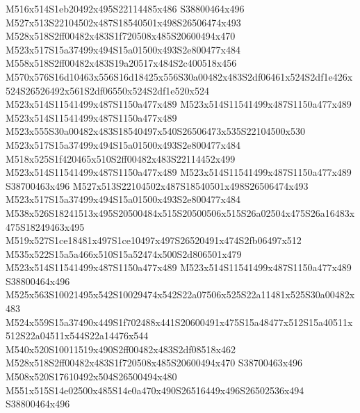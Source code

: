\documentclass{article}
\begin{document}
\begin{multicols}{2}
M516x514S1eb20492x495S22114485x486 S38800464x496 M527x513S22104502x487S18540501x498S26506474x493 M528x518S2ff00482x483S1f720508x485S20600494x470 M523x517S15a37499x494S15a01500x493S2e800477x484 M558x518S2ff00482x483S19a20517x484S2c400518x456 M570x576S16d10463x556S16d18425x556S30a00482x483S2df06461x524S2df1e426x524S26526492x561S2df06550x524S2df1e520x524 M523x514S11541499x487S1150a477x489 M523x514S11541499x487S1150a477x489 M523x514S11541499x487S1150a477x489 M523x555S30a00482x483S18540497x540S26506473x535S22104500x530 M523x517S15a37499x494S15a01500x493S2e800477x484 M518x525S1f420465x510S2ff00482x483S22114452x499 M523x514S11541499x487S1150a477x489 M523x514S11541499x487S1150a477x489 S38700463x496 M527x513S22104502x487S18540501x498S26506474x493 M523x517S15a37499x494S15a01500x493S2e800477x484 M538x526S18241513x495S20500484x515S20500506x515S26a02504x475S26a16483x475S18249463x495 M519x527S1ce18481x497S1ce10497x497S26520491x474S2fb06497x512 M535x522S15a5a466x510S15a52474x500S2d806501x479 M523x514S11541499x487S1150a477x489 M523x514S11541499x487S1150a477x489 S38800464x496 M525x563S10021495x542S10029474x542S22a07506x525S22a11481x525S30a00482x483 M524x559S15a37490x449S1f702488x441S20600491x475S15a48477x512S15a40511x512S22a04511x544S22a14476x544 M540x520S10011519x490S2ff00482x483S2df08518x462 M528x518S2ff00482x483S1f720508x485S20600494x470 S38700463x496 M508x520S17610492x504S26500494x480 M551x515S14e02500x485S14e0a470x490S26516449x496S26502536x494 S38800464x496


\end{multicols}
\end{document}
